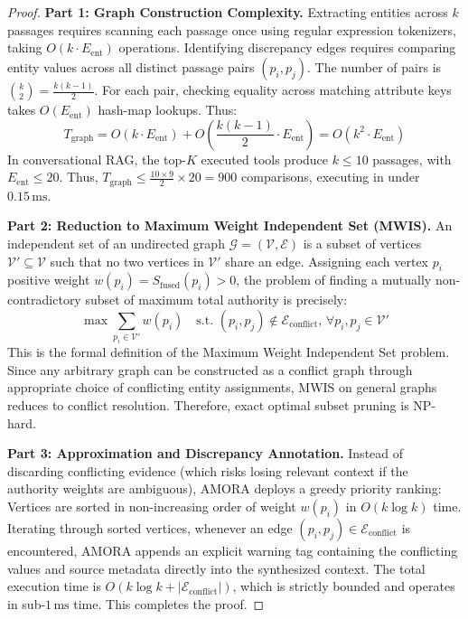 \begin{proof}
\textbf{Part 1: Graph Construction Complexity.}
Extracting entities across $k$ passages requires scanning each passage once using regular expression tokenizers, taking $O(k \cdot E_{\text{ent}})$ operations. Identifying discrepancy edges requires comparing entity values across all distinct passage pairs $(p_i, p_j)$. The number of pairs is $\binom{k}{2} = \frac{k(k-1)}{2}$. For each pair, checking equality across matching attribute keys takes $O(E_{\text{ent}})$ hash-map lookups. Thus:
\begin{equation}
    T_{\text{graph}} = O(k \cdot E_{\text{ent}}) + O\left(\frac{k(k-1)}{2} \cdot E_{\text{ent}}\right) = O(k^2 \cdot E_{\text{ent}})
\end{equation}
In conversational RAG, the top-$K$ executed tools produce $k \le 10$ passages, with $E_{\text{ent}} \le 20$. Thus, $T_{\text{graph}} \le \frac{10 \times 9}{2} \times 20 = 900$ comparisons, executing in under $0.15\,\text{ms}$.

\textbf{Part 2: Reduction to Maximum Weight Independent Set (MWIS).}
An independent set of an undirected graph $\mathcal{G} = (\mathcal{V}, \mathcal{E})$ is a subset of vertices $\mathcal{V}' \subseteq \mathcal{V}$ such that no two vertices in $\mathcal{V}'$ share an edge. Assigning each vertex $p_i$ positive weight $w(p_i) = S_{\text{fused}}(p_i) > 0$, the problem of finding a mutually non-contradictory subset of maximum total authority is precisely:
\begin{equation}
    \max \sum_{p_i \in \mathcal{V}'} w(p_i) \quad \text{s.t. } (p_i, p_j) \notin \mathcal{E}_{\text{conflict}}, \, \forall p_i, p_j \in \mathcal{V}'
\end{equation}
This is the formal definition of the Maximum Weight Independent Set problem. Since any arbitrary graph can be constructed as a conflict graph through appropriate choice of conflicting entity assignments, MWIS on general graphs reduces to conflict resolution. Therefore, exact optimal subset pruning is NP-hard.

\textbf{Part 3: Approximation and Discrepancy Annotation.}
Instead of discarding conflicting evidence (which risks losing relevant context if the authority weights are ambiguous), AMORA deploys a greedy priority ranking:
Vertices are sorted in non-increasing order of weight $w(p_i)$ in $O(k \log k)$ time. Iterating through sorted vertices, whenever an edge $(p_i, p_j) \in \mathcal{E}_{\text{conflict}}$ is encountered, AMORA appends an explicit warning tag containing the conflicting values and source metadata directly into the synthesized context. The total execution time is $O(k \log k + |\mathcal{E}_{\text{conflict}}|)$, which is strictly bounded and operates in sub-$1\,\text{ms}$ time. This completes the proof.
\end{proof}

